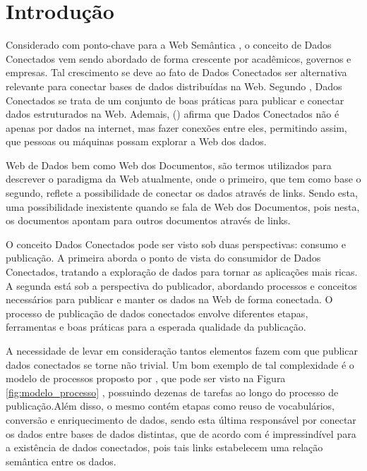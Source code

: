 \chapter{Introdução}
\label{cap:introducao}
Considerado com ponto-chave para a Web Semântica \cite{berners2001semantic}, o conceito de Dados Conectados vem sendo abordado de forma crescente por acadêmicos, governos e empresas. Tal crescimento se deve ao fato de Dados Conectados ser alternativa relevante para conectar bases de dados distribuídas na Web. Segundo \cite{hyland2011joy}, Dados Conectados se trata de um conjunto de boas práticas para publicar e conectar dados estruturados na Web. Ademais, \citeauthor{berners2006linked} (\citeyear{berners2006linked}) afirma que Dados Conectados não é apenas por dados na internet, mas fazer conexões entre eles, permitindo assim, que pessoas ou máquinas possam explorar a Web dos dados.

Web de Dados bem como Web dos Documentos, são termos utilizados para descrever o paradigma da Web atualmente, onde o primeiro, que tem como base o segundo, reflete a possibilidade de conectar os dados através de links. Sendo esta, uma possibilidade inexistente quando se fala de Web dos Documentos, pois nesta, os documentos apontam para outros documentos através de links. 

O conceito Dados Conectados pode ser visto sob duas perspectivas: consumo e publicação. A primeira aborda o ponto de vista do consumidor de Dados Conectados, tratando a exploração de dados para tornar as aplicações mais ricas. A segunda está sob a perspectiva do publicador, abordando processos \cite{bizer2007publish} \cite{hyland2011joy} \cite{villazon2011methodological} \cite{Avila2015} e conceitos \cite{berners2006linked} \cite{wood2014linked} necessários para publicar e manter os dados na Web de forma conectada. O processo de publicação de dados conectados envolve diferentes etapas, ferramentas e boas práticas para a esperada qualidade da publicação. 

A necessidade de levar em consideração tantos elementos fazem com que publicar dados conectados se torne não trivial. Um bom exemplo de tal complexidade é o modelo de processos proposto por \citeauthor{Avila2015}, que pode ser visto na Figura \ref{fig:modelo_processo} , possuindo dezenas de tarefas ao longo do processo de publicação.Além disso, o mesmo contém etapas como reuso de vocabulários, conversão  e enriquecimento de dados, sendo esta última responsável por conectar os dados entre bases de dados distintas, que de acordo com  é impressindível para a existência de dados conectados, pois tais links estabelecem uma relação semântica entre os dados.

